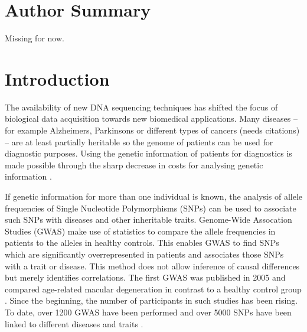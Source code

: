 \documentclass[10pt]{article}
\begin{document}
\section*{Author Summary}
Missing for now.

\section*{Introduction}

The availability of new DNA sequencing techniques has shifted the focus of biological data acquisition towards new biomedical applications.
Many diseases – for example Alzheimers, Parkinsons or different types of cancers (needs citations) – are at least partially heritable so the genome 
of patients can be used for diagnostic purposes. Using the genetic information of patients for diagnostics is made possible through the sharp decrease in costs for analysing genetic information \cite{Brown1999}. 



If genetic information for more than one individual is known, the analysis of
allele frequencies of Single Nucleotide Polymorphisms (SNPs) can be used to associate such SNPs with diseases and other inheritable traits. Genome-Wide Assocation Studies
(GWAS) make use of statistics to compare the allele frequencies in patients to the alleles in healthy controls. This
enables GWAS to find SNPs which are significantly overrepresented in patients and associates those SNPs with a trait or disease.
This method does not allow inference of causal differences but merely identifies correlations. 
The first GWAS was published in 2005 and compared age-related macular degeneration in contrast 
to a healthy control group \cite{Klein2005}. Since the beginning, the number of participants in 
such studies has been rising. To date, over 1200 GWAS have been performed \cite{Johnson2009} and over 
5000 SNPs have been linked to different diseases and traits \cite{Hindorff2009}.   
\end{document}
